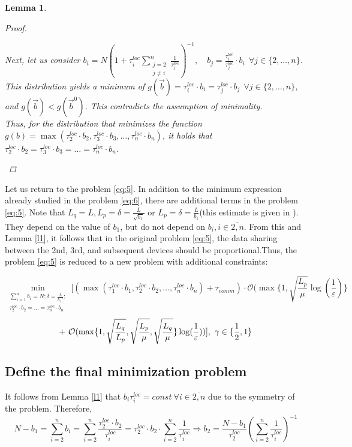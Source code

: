 \documentclass{article}
\newtheorem{lemma}[theorem]{Lemma}
\begin{document}
\begin{lemma}
\begin{proof}
\begin{spacing}{1.3}
        Next, let us consider $b_i = N(1 + \tau_i^{loc}\sum\limits_{\substack{j = 2 \\ j \neq i}}^n \frac{1}{\tau_j^{loc}})^{-1}, \quad b_j = \frac {\tau_i^{loc}}{\tau_j^{loc}}\cdot b_i  ~~ \forall j \in \{2,\ldots,n\}$. 
        This distribution yields a minimum of $g(\overrightarrow{b}) = \tau_i^{loc}\cdot b_i = \tau_j^{loc}\cdot b_j ~~ \forall j \in \{2,\ldots,n\}$, and $g(\overrightarrow{b}) < g(\overrightarrow{b}^0)$. 
        This contradicts the assumption of minimality. 
        \\
        Thus, for the distribution that minimizes the function $g(b) = \max(\tau_2^{loc}\cdot b_2, \tau_3^{loc}\cdot b_3, \ldots, \tau_n^{loc}\cdot b_n)$, it holds that $\tau_2^{loc}\cdot b_2 = \tau_3^{loc}\cdot b_3 = \ldots = \tau_n^{loc}\cdot b_n$.
        \end{spacing}
    \end{proof}
\end{lemma}
Let us return to the problem \ref{eq:5}. In addition to the minimum expression already studied in the problem \ref{eq:6}, there are additional terms in the problem \ref{eq:5}. Note that $L_q = L, L_p = \delta = \frac{L}{\sqrt{b_1}}$ or $L_p = \delta = \frac{L}{b_1}$(this estimate is given in \cite{kovalev2022optimal}).  They depend on the value of $b_1$, but do not depend on $b_i, i \in \overline{2, n}$. From this and Lemma \ref{l1}, it follows that in the original problem \ref{eq:5}, the data sharing between the 2nd, 3rd, and subsequent devices should be proportional.Thus, the problem \ref{eq:5} is reduced to a new problem with additional constraints:

\begin{equation}
    \label{eq:7}
    \min_{\substack{
    \sum\limits_{i = 1}^{n} b_i = N; \delta = \frac{L}{{b_1}^\gamma};\\
   \tau_2^{loc}\cdot b_2 = \ldots = \tau_n^{loc}\cdot b_n
  }} 
    [(\max(\tau_1^{loc}\cdot b_1, \tau_2^{loc}\cdot b_2, \ldots , \tau_n^{loc}\cdot b_n) + \tau_{comm}) \cdot \mathcal O(\max\{1, \sqrt{\frac{L_p}{\mu}}\log(\frac{1}{\varepsilon})\} 
\end{equation}
\begin{equation}
     \notag
     + ~
    \mathcal O(\max\{1,\sqrt{\frac{L_q}{L_p}}, \sqrt{\frac{L_p}{\mu}}, \sqrt{\frac{L_q}{\mu}}\}\log(\frac{1}{\varepsilon}))] ,  ~ \gamma \in \{\frac{1}{2}, 1\}
\end{equation}



\subsection{Define the final minimization problem}
It follows from Lemma \ref{l1} that $b_i \tau_i^{loc} = const ~ \forall i \in \overline{2, n}$ due to the symmetry of the problem.
Therefore, $$ N - b_1 = \sum\limits_{i = 2}^{n} b_i = \sum\limits_{i = 2}^{n} \frac{\tau_2^{loc}\cdot b_2}{\tau_i^{loc}} = \tau_2^{loc}\cdot b_2 \cdot \sum\limits_{i = 2}^{n} \frac{1}{\tau_i^{loc}} \Rightarrow
b_2 = \frac{N - b_1}{\tau_2 ^{loc}}(\sum\limits_{i = 2}^{n} \frac{1}{\tau_i^{loc}})^{-1}$$ 
\end{document}
